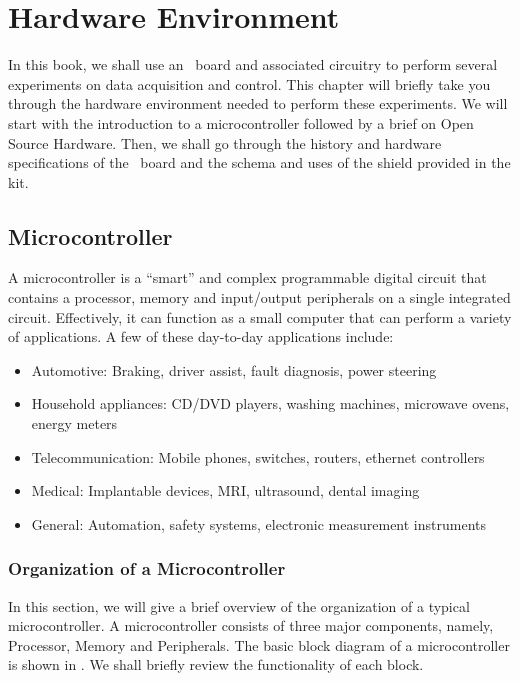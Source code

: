 \chapter{Hardware Environment}
\thispagestyle{empty}
\label{sec:hw-env}
\newcommand{\LocHWfig}{\Origin/user-code/hw-env/figures}
\newcommand{\LocHWscicode}{\Origin/user-code/hw-env/scilab}
\newcommand{\LocHWscibrief}{Origin/user-code/hw-env/scilab}
\newcommand{\LocHWardcode}{\Origin/user-code/hw-env/arduino}
\newcommand{\LocHWardbrief}{\tt Origin/user-code/hw-env/arduino}
\newcommand{\LocSH}{\Origin/tools/shield}
\newcommand{\LocSHbrief}[1]{{\tt Origin/tools/shield/#1}, see \fnrefp{fn:file-loc}}

In this book, we shall use an \arduino\ board and associated circuitry
to perform several experiments on data acquisition and control. This
chapter will briefly take you through the hardware environment needed
to perform these experiments. We will start with the introduction to a
microcontroller followed by a brief on Open Source Hardware. Then, we
shall go through the history and hardware specifications of the
\arduino\ board and the schema and uses of the shield provided in
the kit.


\section{Microcontroller}
A microcontroller is a ``smart'' and complex programmable digital circuit
that contains a processor, memory and input/output peripherals on a
single integrated circuit. Effectively, it can function as a small
computer that can perform a variety of applications. A few of these
day-to-day applications include:
\begin{itemize}
\item Automotive: Braking, driver assist, fault diagnosis, power
  steering
\item Household appliances: CD/DVD players, washing machines,
  microwave ovens, energy meters
\item Telecommunication: Mobile phones, switches, routers, ethernet
  controllers
\item Medical: Implantable devices, MRI, ultrasound, dental imaging
\item General: Automation, safety systems, electronic measurement
  instruments
\end{itemize}

\subsection{Organization of a Microcontroller}
In this section, we will give a brief overview of the organization of
a typical microcontroller.  A microcontroller consists of three major
components, namely, Processor, Memory and Peripherals. The basic block
diagram of a microcontroller is shown in . We shall
briefly review the functionality of each block.


